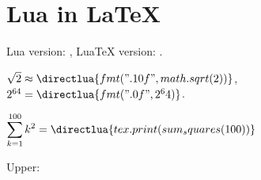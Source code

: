 \documentclass{article}
\begin{document}
\section*{Lua in LaTeX}

Lua version: ,
LuaTeX version: .

$\sqrt{2} \approx \directlua{fmt(".10f", math.sqrt(2))}$,
\quad
$2^{64} = \directlua{fmt(".0f", 2^64)}$.

$\displaystyle\sum_{k=1}^{100} k^2 = \directlua{tex.print(sum_squares(100))}$

\bigskip
{}

\bigskip
Upper: 
\end{document}
